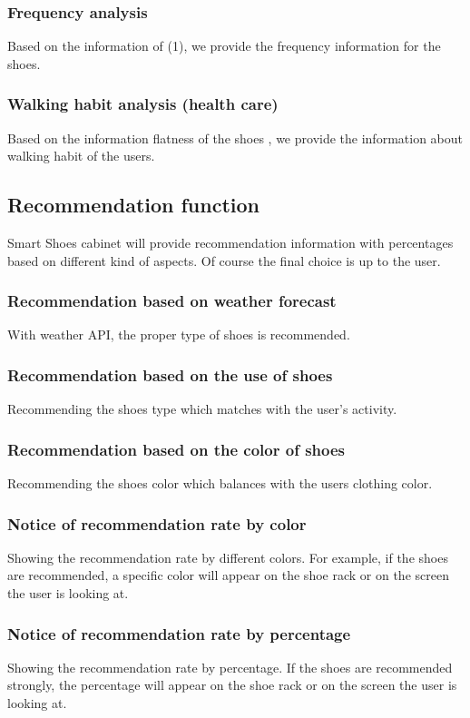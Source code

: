 \documentclass[conference]{IEEEtran}
\begin{document}
\subsubsection{Frequency analysis}
Based on the information of (1), we provide the frequency information for the shoes.\\
\subsubsection{Walking habit analysis (health care)}
Based on the information flatness of the shoes , we provide the information about walking habit of the users.\\


\subsection{Recommendation function}
Smart Shoes cabinet will provide recommendation information with percentages based on different kind of aspects. Of course the final choice is up to the user.\\
\subsubsection{Recommendation based on weather forecast }
With weather API, the proper type of shoes is recommended.\\
\subsubsection{ Recommendation based on the use of shoes}
Recommending the shoes type which matches with the user's activity.\\
\subsubsection{Recommendation based on the color of shoes}
Recommending the shoes color which balances with the users clothing color.\\
\subsubsection{ Notice of recommendation rate by color}
Showing the recommendation rate by different colors. For example, if the shoes are recommended, a specific color will appear on the shoe rack or on the screen the user is looking at. \\
\subsubsection{Notice of recommendation rate by percentage}
Showing the recommendation rate by percentage. If the shoes are recommended strongly, the percentage will appear on the shoe rack or on the screen the user is looking at. \\
\end{document}
